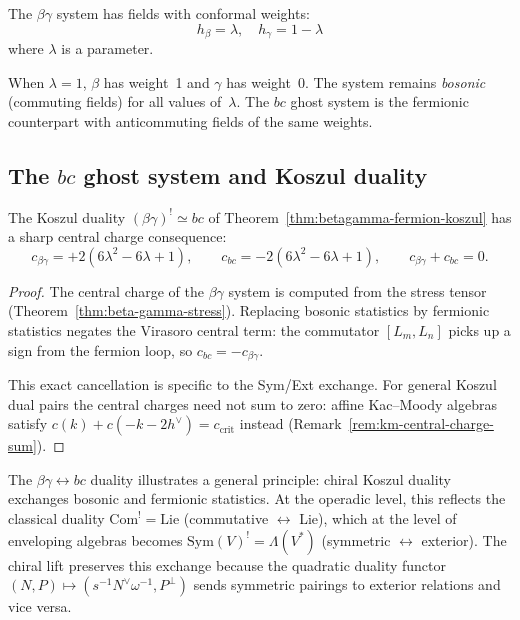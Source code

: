 \begin{remark}
The $\beta\gamma$ system has fields with conformal weights:
\[h_\beta = \lambda, \quad h_\gamma = 1-\lambda\]
where $\lambda$ is a parameter.

When $\lambda = 1$, $\beta$ has weight~1 and $\gamma$ has weight~0.  The system remains \emph{bosonic} (commuting fields) for all values of~$\lambda$.  The $bc$ ghost system is the fermionic counterpart with anticommuting fields of the same weights.
\end{remark}

\subsection{\texorpdfstring{The $bc$ ghost system and Koszul duality}{The bc ghost system and Koszul duality}}

\begin{proposition}\label{prop:betagamma-bc-koszul-detailed}
The Koszul duality $(\beta\gamma)^! \simeq bc$ of Theorem~\ref{thm:betagamma-fermion-koszul}
has a sharp central charge consequence:
\begin{equation}\label{eq:bg-bc-koszul}
c_{\beta\gamma} = +2(6\lambda^2 - 6\lambda + 1),
\qquad
c_{bc} = -2(6\lambda^2 - 6\lambda + 1),
\qquad
c_{\beta\gamma} + c_{bc} = 0.
\end{equation}
\end{proposition}

\begin{proof}
The central charge of the $\beta\gamma$ system is computed from the stress tensor (Theorem~\ref{thm:beta-gamma-stress}).  Replacing bosonic statistics by fermionic statistics negates the Virasoro central term: the commutator $[L_m, L_n]$ picks up a sign from the fermion loop, so $c_{bc} = -c_{\beta\gamma}$.

This exact cancellation is specific to the Sym/Ext exchange.
For general Koszul dual pairs the central charges need not sum to zero:
affine Kac--Moody algebras satisfy
$c(k) + c(-k-2h^\vee) = c_{\mathrm{crit}}$ instead
(Remark~\ref{rem:km-central-charge-sum}).
\end{proof}

\begin{remark}\label{rem:statistics-exchange}
The $\beta\gamma \leftrightarrow bc$ duality illustrates a general principle: chiral Koszul duality exchanges bosonic and fermionic statistics. At the operadic level, this reflects the classical duality $\mathrm{Com}^! = \mathrm{Lie}$ (commutative $\leftrightarrow$ Lie), which at the level of enveloping algebras becomes $\mathrm{Sym}(V)^! = \Lambda(V^*)$ (symmetric $\leftrightarrow$ exterior). The chiral lift preserves this exchange because the quadratic duality functor $(N, P) \mapsto (s^{-1}N^\vee\omega^{-1}, P^\perp)$ sends symmetric pairings to exterior relations and vice versa.
\end{remark}

